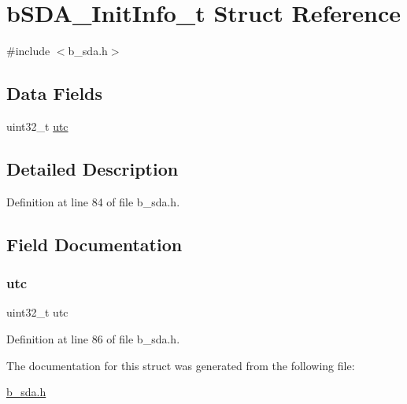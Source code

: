 \hypertarget{structb_s_d_a___init_info__t}{}\section{b\+S\+D\+A\+\_\+\+Init\+Info\+\_\+t Struct Reference}
\label{structb_s_d_a___init_info__t}


{\ttfamily \#include $<$b\+\_\+sda.\+h$>$}

\subsection*{Data Fields}
\begin{DoxyCompactItemize}
\item 
uint32\+\_\+t \mbox{\hyperlink{structb_s_d_a___init_info__t_ac33a21166535be799d0d3743c23ad044}{utc}}
\end{DoxyCompactItemize}


\subsection{Detailed Description}


Definition at line 84 of file b\+\_\+sda.\+h.



\subsection{Field Documentation}
\mbox{\label{structb_s_d_a___init_info__t_ac33a21166535be799d0d3743c23ad044}} 
\subsubsection{\texorpdfstring{utc}{utc}}
{\footnotesize\ttfamily uint32\+\_\+t utc}



Definition at line 86 of file b\+\_\+sda.\+h.



The documentation for this struct was generated from the following file\+:\begin{DoxyCompactItemize}
\item 
\mbox{\hyperlink{b__sda_8h}{b\+\_\+sda.\+h}}\end{DoxyCompactItemize}
